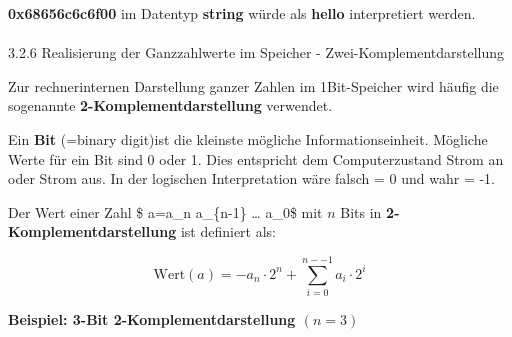 \documentclass[
  11pt,
  a4paper,
  DIV=11,
  numbers=noendperiod]{scrartcl}
\makeatletter
\let\oldparagraph\paragraph
\renewcommand{\paragraph}{
    \@ifstar
      \xxxParagraphStar
      \xxxParagraphNoStar
  }
\newcommand{\xxxParagraphStar}[1]{\oldparagraph*{#1}\mbox{}}
\newcommand{\xxxParagraphNoStar}[1]{\oldparagraph{#1}\mbox{}}
\makeatother
\begin{document}
\textbf{0x68656c6c6f00} im Datentyp \textbf{string} würde als
\textbf{hello} interpretiert werden.

\paragraph{3.2.6 Realisierung der Ganzzahlwerte im Speicher -
Zwei-Komplementdarstellung}\label{realisierung-der-ganzzahlwerte-im-speicher---zwei-komplementdarstellung}

Zur rechnerinternen Darstellung ganzer Zahlen im 1Bit-Speicher wird
häufig die sogenannte \textbf{2-Komplementdarstellung} verwendet.

\begin{tcolorbox}[enhanced jigsaw, bottomrule=.15mm, arc=.35mm, colframe=quarto-callout-note-color-frame, left=2mm, opacitybacktitle=0.6, colback=white, breakable, title=\textcolor{quarto-callout-note-color}{\faInfo}\hspace{0.5em}{Definition}, titlerule=0mm, toprule=.15mm, rightrule=.15mm, leftrule=.75mm, colbacktitle=quarto-callout-note-color!10!white, coltitle=black, opacityback=0, toptitle=1mm, bottomtitle=1mm]

Ein \textbf{Bit} (=binary digit)ist die kleinste mögliche
Informationseinheit. Mögliche Werte für ein Bit sind 0 oder 1. Dies
entspricht dem Computerzustand Strom an oder Strom aus. In der logischen
Interpretation wäre falsch = 0 und wahr = -1.

\end{tcolorbox}

\begin{tcolorbox}[enhanced jigsaw, bottomrule=.15mm, arc=.35mm, colframe=quarto-callout-note-color-frame, left=2mm, opacitybacktitle=0.6, colback=white, breakable, title=\textcolor{quarto-callout-note-color}{\faInfo}\hspace{0.5em}{Definition}, titlerule=0mm, toprule=.15mm, rightrule=.15mm, leftrule=.75mm, colbacktitle=quarto-callout-note-color!10!white, coltitle=black, opacityback=0, toptitle=1mm, bottomtitle=1mm]

Der Wert einer Zahl \$ a=a\_n a\_\{n-1\} \ldots{} a\_0\$ mit \(n\) Bits
in \textbf{2-Komplementdarstellung} ist definiert als:

\[ \text{Wert}(a) =  -a_n·2^{n}+\sum_{i=0}^{n--1} a_i·2^i \]

\end{tcolorbox}

\textbf{Beispiel: 3-Bit 2-Komplementdarstellung \((n = 3)\)}
\end{document}
